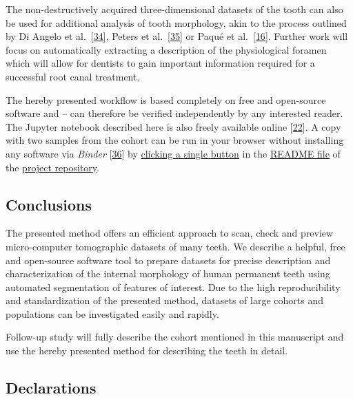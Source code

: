 \documentclass[
  american,
]{article}
\begin{document}
The non-destructively acquired three-dimensional datasets of the tooth can also be used for additional analysis of tooth morphology, akin to the process outlined by Di Angelo et al.~{[}\protect\hyperlink{ref-1Egw08k0d}{34}{]}, Peters et al.~{[}\protect\hyperlink{ref-RxErLYuw}{35}{]} or Paqué et al.~{[}\protect\hyperlink{ref-DLVCfdzK}{16}{]}.
Further work will focus on automatically extracting a description of the physiological foramen which will allow for dentists to gain important information required for a successful root canal treatment.

The hereby presented workflow is based completely on free and open-source software and -- can therefore be verified independently by any interested reader.
The Jupyter notebook described here is also freely available online {[}\protect\hyperlink{ref-tZRGGuMm}{22}{]}.
A copy with two samples from the cohort can be run in your browser without installing any software via \emph{Binder} {[}\protect\hyperlink{ref-Q20Bxdsr}{36}{]} by \href{https://mybinder.org/v2/gh/habi/zmk-tooth-cohort/master?filepath=ToothAnalysis.ipynb}{clicking a single button} in the \href{https://github.com/habi/zmk-tooth-cohort/blob/master/README.md}{README file} of the \href{https://github.com/habi/zmk-tooth-cohort/}{project repository}.

\hypertarget{conclusions}{%
\subsection{Conclusions}\label{conclusions}}

The presented method offers an efficient approach to scan, check and preview micro-computer tomographic datasets of many teeth.
We describe a helpful, free and open-source software tool to prepare datasets for precise description and characterization of the internal morphology of human permanent teeth using automated segmentation of features of interest.
Due to the high reproducibility and standardization of the presented method, datasets of large cohorts and populations can be investigated easily and rapidly.

Follow-up study will fully describe the cohort mentioned in this manuscript and use the hereby presented method for describing the teeth in detail.

\hypertarget{declarations}{%
\subsection{Declarations}\label{declarations}}
\end{document}

